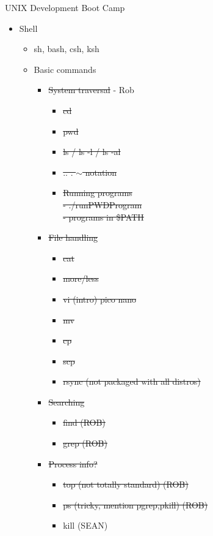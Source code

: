 \documentclass[12pt]{article}
\begin{document}
UNIX Development Boot Camp 
\begin{itemize}
	\item Shell 
	\begin{itemize}
		\item sh, bash, csh, ksh 
		\item Basic commands 
		\begin{itemize}
			\item \sout{System traversal} - Rob
			\begin{itemize}
				\item \sout{cd} 
				\item \sout{pwd}
				\item \sout{ls / ls -l / ls -al }
				\item \sout{.. . $\sim$ notation} %
				\item \sout{Running programs} \\ %
					\sout{- ./runPWDProgram} \\
					\sout{- programs in \$PATH}
			\end{itemize}
			\item \sout{File handling}
			\begin{itemize}
				\item \sout{cat}
				\item \sout{more/less}
				\item \sout{vi (intro) pico nano}
				\item \sout{mv}
				\item \sout{cp} 
				\item \sout{scp} 
				\item \sout{rsync (not packaged with all distros)}
			\end{itemize}
			\item \sout{Searching}
			\begin{itemize}
				\item \sout{find (ROB) }
				\item \sout{grep (ROB) }
			\end{itemize}
			\item \sout {Process info? }
			\begin{itemize}
				\item \sout {top (not totally standard) (ROB) }
				\item \sout{ps (tricky, mention pgrep,pkill) (ROB) }
				\item kill (SEAN)
			\end{itemize}

\end{itemize}
\end{itemize}
\end{itemize}
\end{document}

